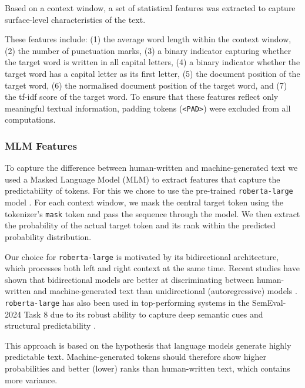 \documentclass[11pt]{article}
\begin{document}
Based on a context window, a set of statistical features was extracted to capture surface-level characteristics of the text.

These features include: (1) the average word length within the context window, (2) the number of punctuation marks, (3) a binary indicator capturing whether the target word is written in all capital letters, (4) a binary indicator whether the target word has a capital letter as its first letter, (5) the document position of the target word, (6) the normalised document position of the target word, and (7) the tf-idf score of the target word.
To ensure that these features reflect only meaningful textual information, padding tokens (\texttt{<PAD>}) were excluded from all computations.

\subsubsection{MLM Features}


To capture the difference between human-written and machine-generated text we used a Masked Language Model (MLM) to extract features
that capture the predictability of tokens.
For this we chose to use the pre-trained \texttt{roberta-large} model \cite{liu2019roberta}. For each context window, we mask the
central target token using the tokenizer's \texttt{mask} token and pass the sequence through the model.
We then extract the probability of the actual target token and its rank within the predicted probability distribution.

Our choice for \texttt{roberta-large} is motivated by its bidirectional architecture, which processes both left and right context at the
same time.
Recent studies have shown that bidirectional models are better at discriminating between human-written and machine-generated text than
unidirectional (autoregressive) models \cite{huang-etal-2024-ai}.
\texttt{roberta-large} has also been used in top-performing systems in the SemEval-2024 Task 8 due to its robust ability to capture deep
semantic cues and structural predictability \cite{datta2024weighted}.

This approach is based on the hypothesis that language models generate highly predictable text.
Machine-generated tokens should therefore show higher probabilities and better (lower) ranks than human-written text,
which contains more variance.
\end{document}
